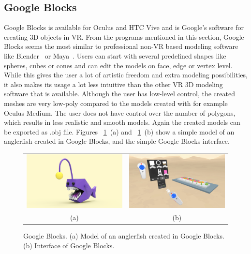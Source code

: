 \subsection{Google Blocks}
Google Blocks is available for Oculus and HTC Vive and is Google's software for creating 3D objects in VR. From the programs mentioned in this section, Google Blocks seems the most similar to professional non-VR based modeling software like Blender~\cite{Blender} or Maya~\cite{Maya}. Users can start with several predefined shapes like spheres, cubes or cones and can edit the models on face, edge or vertex level. While this gives the user a lot of artistic freedom and extra modeling possibilities, it also makes its usage a lot less intuitive than the other VR 3D modeling software that is available. Although the user has low-level control, the created meshes are very low-poly compared to the models created with for example Oculus Medium. The user does not have control over the number of polygons, which results in less realistic and smooth models. Again the created models can be exported as .obj file. Figures ~\ref{fig:blocks}~(a) and ~\ref{fig:blocks}~(b) show a simple model of an anglerfish created in Google Blocks, and the simple Google Blocks interface.

\begin{figure}[!h]
    \centering
    \setlength{\tabcolsep}{0.0130\linewidth}
    \begin{tabular}{@{}cc@{}}
   	\includegraphics[width=0.487\linewidth]{figures/blocks_anglerfish}&
   	\includegraphics[width=0.487\linewidth]{figures/blocks_interface}\\
    (a)&(b)\\
    \end{tabular}
    \caption[Google Blocks]{Google Blocks.
    	  \textup{(a)} Model of an anglerfish created in Google Blocks.
			  \textup{(b)} Interface of Google Blocks. 
      \label{fig:blocks}}
\end{figure}